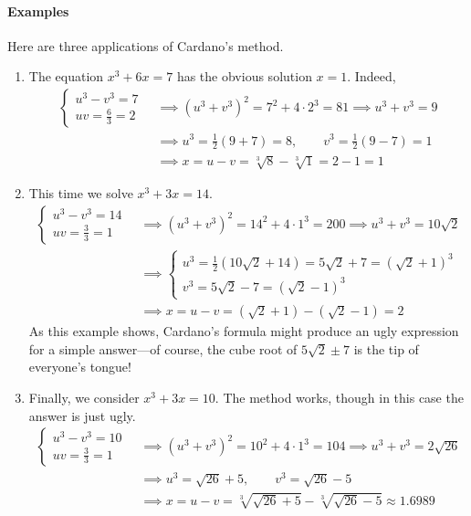 \paragraph{Examples}
Here are three applications of Cardano's method.
\begin{enumerate}
	\item The equation $x^3+6x=7$ has the obvious solution $x=1$. Indeed,
	\begin{align*}
		\begin{cases}
			u^3-v^3=7\\
			uv=\frac 63=2
		\end{cases}\ 
		&\implies (u^3+v^3)^2=7^2+4\cdot 2^3=81 \implies u^3+v^3=9\\[-5pt]
		&\implies u^3=\frac 12(9+7)=8,\qquad v^3=\frac 12(9-7)=1\\
		&\implies x=u-v=\sqrt[3]{8}-\sqrt[3]{1} =2-1=1
	\end{align*}
	
  \item This time we solve $x^3+3x=14$.
	\begin{align*}
		\begin{cases}
			u^3-v^3=14\\
			uv=\frac 33=1
		\end{cases}\ 
		&\implies (u^3+v^3)^2=14^2+4\cdot 1^3=200 \implies u^3+v^3=10\sqrt 2\\[-6pt]
		&\implies
		\begin{cases}
			u^3=\frac 12(10\sqrt 2+14)=5\sqrt 2+7 =(\sqrt 2+1)^3\\
			v^3=5\sqrt 2-7=(\sqrt 2-1)^3
		\end{cases}\\
		&\implies x=u-v=(\sqrt 2+1)-(\sqrt 2-1)=2
	\end{align*}
	As this example shows, Cardano's formula might produce an ugly expression for a simple answer---of course, the cube root of $5\sqrt 2\pm 7$ is the tip of everyone's tongue!
	
	\item Finally, we consider $x^3+3x=10$. The method works, though in this case the answer is just ugly.
	\begin{align*}
		\begin{cases}
			u^3-v^3=10\\
			uv=\frac 33=1
		\end{cases}\ 
		&\implies (u^3+v^3)^2=10^2+4\cdot 1^3=104 \implies u^3+v^3=2\sqrt{26}\\[-3pt]
		&\implies u^3=\sqrt{26}+5,\qquad v^3=\sqrt{26}-5\\
		&\implies x=u-v=\sqrt[3]{\sqrt{26}+5}-\sqrt[3]{\sqrt{26}-5} \approx 1.6989
	\end{align*}
\end{enumerate}


